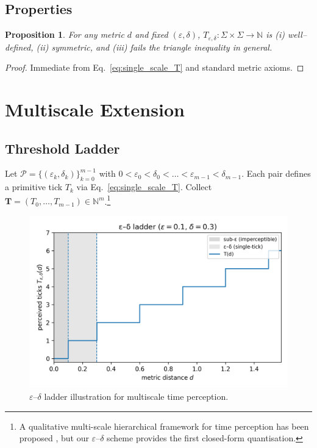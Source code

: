\documentclass[preprint,11pt]{elsarticle}
\newtheorem{proposition}{Proposition}
\newcommand{\N}{\mathbb{N}}
\begin{document}
\subsection{Properties}
\begin{proposition}
For any metric $d$ and fixed $(\varepsilon,\delta)$,
$T_{\varepsilon,\delta}\!:\Sigma\times\Sigma\to\N$ is
(i) well--defined, (ii) symmetric, and (iii) fails the triangle
inequality in general.
\end{proposition}

\begin{proof}
Immediate from Eq.~\eqref{eq:single_scale_T} and standard metric
axioms.
\end{proof}

\section{Multiscale Extension}
\subsection{Threshold Ladder}
Let $\mathcal P=\{(\varepsilon_k,\delta_k)\}_{k=0}^{m-1}$ with
$0<\varepsilon_0<\delta_0<\dots<\varepsilon_{m-1}<\delta_{m-1}$.
Each pair defines a primitive tick $T_k$ via
Eq.~\eqref{eq:single_scale_T}.  Collect
$\mathbf T=(T_0,\dots,T_{m-1})\in\N^{m}$.\footnote{A qualitative multi-scale
hierarchical framework for time perception has been proposed
\citep{Singhal2021}, but our $\varepsilon$--$\delta$ scheme provides the first
closed-form quantisation.}

\begin{figure}[ht]
  \centering
  \includegraphics[width=0.9\linewidth]{figures/epsilon_delta_ladder.png}
  \caption{\(\varepsilon\)--\(\delta\) ladder illustration for multiscale time perception.}
  \label{fig:epsilon_delta_ladder}
\end{figure}
\end{document}
